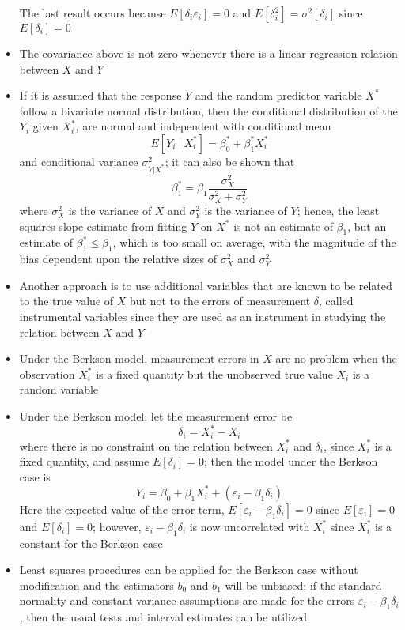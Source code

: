 \begin{itemize}
The last result occurs because $E[\delta_i\varepsilon_i] = 0$ and $E[\delta_i^2] = \sigma^2[\delta_i]$ since $E[\delta_i] = 0$
\item The covariance above is not zero whenever there is a linear regression relation between $X$ and $Y$
\item If it is assumed that the response $Y$ and the random predictor variable $X^*$ follow a bivariate normal distribution, then the conditional distribution of the $Y_i$ given $X_i^*$, are normal and independent with conditional mean $$ E[Y_i ~|~ X_i^*] = \beta_0^* + \beta_1^*X_i^* $$ and conditional variance $\sigma^2_{Y|X^*}$; it can also be shown that $$ \beta_1^* = \beta_1\frac{\sigma_X^2}{\sigma_X^2 + \sigma_Y^2} $$ where $\sigma^2_X$ is the variance of $X$ and $\sigma_Y^2$ is the variance of $Y$; hence, the least squares slope estimate from fitting $Y$ on $X^*$ is not an estimate of $\beta_1$, but an estimate of $\beta_1^* \leq \beta_1$,  which is too small on average, with the magnitude of the bias dependent upon the relative sizes of $\sigma^2_X$ and $\sigma^2_Y$
\item Another approach is to use additional variables that are known to be related to the true value of $X$ but not to the errors of measurement $\delta$, called instrumental variables since they are used as an instrument in studying the relation between $X$ and $Y$
\item Under the Berkson model, measurement errors in $X$ are no problem when the observation $X_i^*$ is a fixed quantity but the unobserved true value $X_i$ is a random variable
\item Under the Berkson model, let the measurement error be $$ \delta_i = X_i^* - X_i $$ where there is no constraint on the relation between $X_i^*$ and $\delta_i$, since $X_i^*$ is a fixed quantity, and assume $E[\delta_i] = 0$;
then the model under the Berkson case is $$ Y_i = \beta_0 + \beta_1X_i^* + (\varepsilon_i - \beta_1\delta_i) $$ 
Here the expected value of the error term, $E[\varepsilon_i - \beta_1\delta_i] = 0$ since $E[\varepsilon_i] = 0$ and $E[\delta_i] = 0$; however, $\varepsilon_i - \beta_1\delta_i$ is now uncorrelated with $X_i^*$ since $X_i^*$ is a constant for the Berkson case
\item Least squares procedures can be applied for the Berkson case without modification and the estimators $b_0$ and $b_1$ will be unbiased; if the standard normality and constant variance assumptions are made for the errors $\varepsilon_i - \beta_1\delta_i$, then the usual tests and interval estimates can be utilized
\end{itemize}

